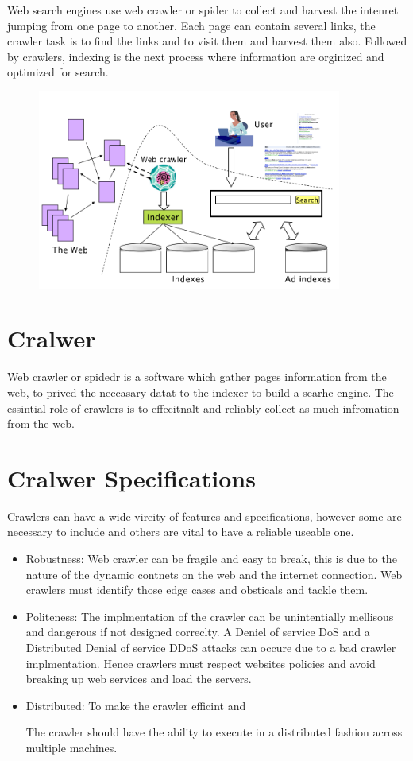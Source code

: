 Web search engines use web crawler or spider to collect and harvest the intenret jumping from one page to another. Each page can contain several links, the crawler task is to find the links and to visit them and harvest them also. Followed by crawlers, indexing is the next process where information are orginized and optimized for search. 
\begin{figure}[h]	
     \centering
         \includegraphics[width=10cm]{images/engine_components.png}
\end{figure}

\section{Cralwer}
Web crawler or spidedr is a software which gather pages information from the web, to prived the neccasary datat to the indexer to build a searhc engine. The essintial role of crawlers is to effecitnalt and reliably collect as much infromation from the web. 

\section{Cralwer Specifications}
Crawlers can have a wide vireity of features and specifications, however some are necessary to include and others are vital to have a reliable useable one. 

\begin{itemize}
  \item Robustness: Web crawler can be fragile and easy to break, this is due to the nature of the dynamic contnets on the web and the internet connection. Web crawlers must identify those edge cases and obsticals and tackle them.  
  \item Politeness: The implmentation of the crawler can be unintentially mellisous and dangerous if not designed correclty. A Deniel of service DoS and a Distributed Denial of service DDoS attacks can occure due to a bad crawler implmentation. Hence crawlers must respect websites policies and avoid breaking up web services and load the servers.

\item Distributed: To make the crawler efficint and 

The crawler should have the ability to execute in a distributed
fashion across multiple machines.
\end{itemize}


